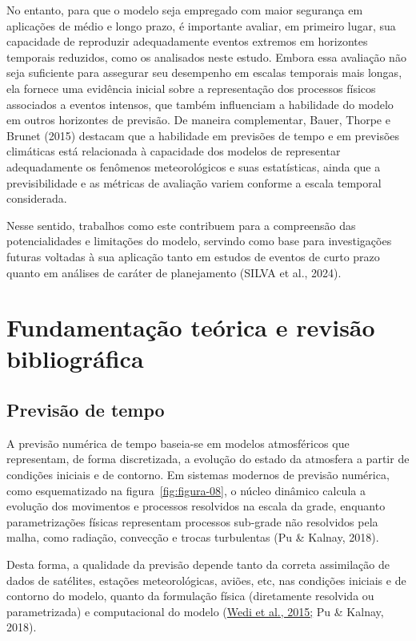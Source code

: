 \documentclass[12pt,a4paper,oneside]{book}
\begin{document}
No entanto, para que o modelo seja empregado com maior segurança em aplicações de médio e longo prazo, é importante avaliar, em primeiro lugar, sua capacidade de reproduzir adequadamente eventos extremos em horizontes temporais reduzidos, como os analisados neste estudo. Embora essa avaliação não seja suficiente para assegurar seu desempenho em escalas temporais mais longas, ela fornece uma evidência inicial sobre a representação dos processos físicos associados a eventos intensos, que também influenciam a habilidade do modelo em outros horizontes de previsão. De maneira complementar, Bauer, Thorpe e Brunet (2015) destacam que a habilidade em previsões de tempo e em previsões climáticas está relacionada à capacidade dos modelos de representar adequadamente os fenômenos meteorológicos e suas estatísticas, ainda que a previsibilidade e as métricas de avaliação variem conforme a escala temporal considerada.

Nesse sentido, trabalhos como este contribuem para a compreensão das potencialidades e limitações do modelo, servindo como base para investigações futuras voltadas à sua aplicação tanto em estudos de eventos de curto prazo quanto em análises de caráter de planejamento (SILVA et al., 2024).

\chapter{Fundamentação teórica e revisão bibliográfica}

\section{Previsão de tempo}

A previsão numérica de tempo baseia-se em modelos atmosféricos que representam, de forma discretizada, a evolução do estado da atmosfera a partir de condições iniciais e de contorno. Em sistemas modernos de previsão numérica, como esquematizado na figura~\ref*{fig:figura-08}, o núcleo dinâmico calcula a evolução dos movimentos e processos resolvidos na escala da grade, enquanto parametrizações físicas representam processos sub-grade não resolvidos pela malha, como radiação, convecção e trocas turbulentas (Pu \& Kalnay, 2018).

Desta forma, a qualidade da previsão depende tanto da correta assimilação de dados de satélites, estações meteorológicas, aviões, etc, nas condições iniciais e de contorno do modelo, quanto da formulação física (diretamente resolvida ou parametrizada) e computacional do modelo (\href{https://www.ecmwf.int/sites/default/files/elibrary/2015/15259-modelling-infrastructure-integrated-forecasting-system-recent-advances-and-future-challenges.pdf}{Wedi et al., 2015;} Pu \& Kalnay, 2018).
\end{document}
